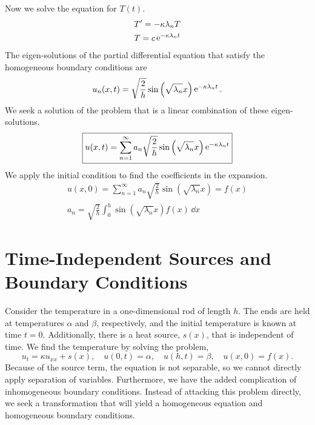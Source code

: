 Now we solve the equation for $T(t)$.
\begin{gather*}
  T' = - \kappa \lambda_n T \\
  T = c \mathop{\mathrm{e}}\nolimits^{- \kappa \lambda_n t}
\end{gather*}
The eigen-solutions of the partial differential equation that satisfy the
homogeneous boundary conditions are 
\[
u_n(x,t) = \sqrt{ \frac{2}{h} } \sin \left( \sqrt{\lambda_n} x \right) 
\mathop{\mathrm{e}}\nolimits^{- \kappa \lambda_n t}.
\]
We seek a solution of the problem that is a linear combination of 
these eigen-solutions. 
\[
\boxed{
  u(x,t) = \sum_{n=1}^\infty a_n \sqrt{ \frac{2}{h} } 
  \sin \left( \sqrt{\lambda_n} x \right) 
  \mathop{\mathrm{e}}\nolimits^{- \kappa \lambda_n t}
  }
\]
We apply the initial condition to find the coefficients in the expansion.
\begin{gather*}
  u(x,0) = \sum_{n=1}^\infty a_n \sqrt{ \frac{2}{h} }
  \sin \left( \sqrt{\lambda_n} x \right) = f(x) \\
  \boxed{
    a_n = \sqrt{ \frac{2}{h} } \int_0^h \sin \left( \sqrt{\lambda_n} x \right) 
    f(x) \,\dd x
    }
\end{gather*}






\section{Time-Independent Sources and Boundary Conditions}




Consider the temperature in a one-dimensional rod of length $h$.  The 
ends are held at temperatures $\alpha$ and $\beta$, respectively, 
and the initial temperature is known at time $t = 0$.  
Additionally, there is a heat source, $s(x)$, that 
is independent of time.  We find the temperature by solving the problem,
\begin{equation}
  \label{u_t=kappau_xx+sx}
  u_t = \kappa u_{xx} + s(x), \quad 
  u(0,t) = \alpha, \quad u(h,t) = \beta, \quad 
  u(x,0) = f(x). 
\end{equation}
Because of the source term, the equation is not separable, so we cannot
directly apply separation of variables.  Furthermore, we have the added
complication of inhomogeneous boundary conditions.  Instead of
attacking this problem directly, we seek a transformation that will
yield a homogeneous equation and homogeneous boundary conditions.

